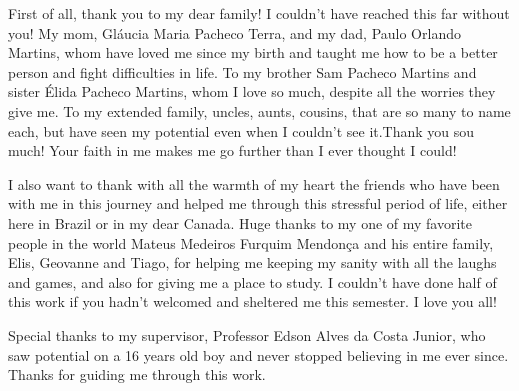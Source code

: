 \begin{agradecimentos}

First of all, thank you to my dear family! I couldn't have reached this far without you! My mom, Gl\'aucia Maria Pacheco Terra, and my dad, Paulo Orlando Martins, whom have loved me since my birth and taught me how to be a better person and fight difficulties in life. To my brother Sam Pacheco Martins and sister \'Elida Pacheco Martins, whom I love so much, despite all the worries they give me. To my extended family, uncles, aunts, cousins, that are so many to name each, but have seen my potential even when I couldn't see it.Thank you sou much! Your faith in me makes me go further than I ever thought I could!

I also want to thank with all the warmth of my heart the friends who have been with me in this journey and helped me through this stressful period of life, either here in Brazil or in my dear Canada. Huge thanks to my one of my favorite people in the world Mateus Medeiros Furquim Mendon\c{c}a and his entire family, Elis, Geovanne and Tiago, for helping me keeping my sanity with all the laughs and games, and also for giving me a place to study. I couldn't have done half of this work if you hadn't welcomed and sheltered me this semester. I love you all!

Special thanks to my supervisor, Professor Edson Alves da Costa Junior, who saw potential on a 16 years old boy and never stopped believing in me ever since. Thanks for guiding me through this work.

\end{agradecimentos}
